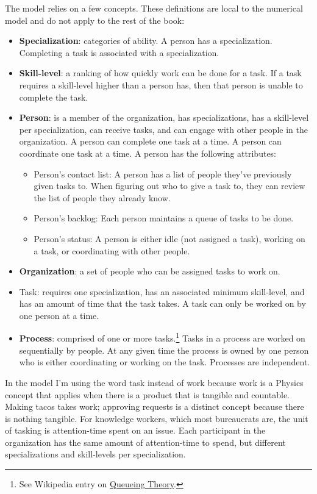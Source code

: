 The model relies on a few concepts. These definitions are local to the numerical model and do not apply to the rest of the book:
\begin{itemize}
    \item \textbf{Specialization}: categories of ability. A person has a specialization. Completing a task is associated with a specialization.
    \item \textbf{Skill-level}: a ranking of how quickly work can be done for a task. If a task requires a skill-level higher than a person has, then that person is unable to complete the task.
    \item \textbf{Person}: is a member of the organization, has specializations, has a skill-level per specialization, can receive tasks, and can engage with other people in the organization. A person can complete one task at a time. A person can coordinate one task at a time. A person has the following attributes:
    \begin{itemize}
        \item Person's contact list: A person has a list of people they've previously given tasks to. When figuring out who to give a task to, they can review the list of people they already know. 
        \item Person's backlog: Each person maintains a queue of tasks to be done.
        \item Person's status: A person is either idle (not assigned a task), working on a task, or coordinating with other people. 
    \end{itemize}
    \item \textbf{Organization}: a set of people who can be assigned tasks to work on. 
    \item Task: requires one specialization, has an associated minimum skill-level, and has an amount of time that the task takes. A task can only be worked on by one person at a time. 
    \item \textbf{Process}: comprised of one or more tasks.\footnote{See Wikipedia entry on 
    \href{https://en.wikipedia.org/wiki/Queueing_theory}{Queueing Theory}.} Tasks in a process are worked on sequentially by people. At any given time the process is owned by one person who is either coordinating or working on the task.  Processes are independent.
\end{itemize}

In the model I'm using the word task instead of work because work is a Physics concept that applies when there is a product that is tangible and countable. Making tacos takes work; approving requests is a distinct concept because there is nothing tangible. For knowledge workers, which most bureaucrats are, the unit of tasking is attention-time spent on an issue.
Each participant in the organization has the same amount of attention-time to spend, but different specializations and skill-levels per specialization.

